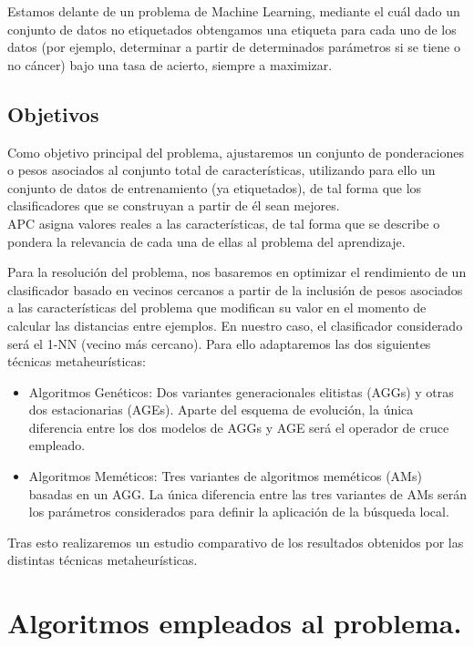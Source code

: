 Estamos delante de un problema de Machine Learning, mediante el cuál dado un conjunto de datos no etiquetados obtengamos una etiqueta para cada uno de los datos (por ejemplo, determinar a partir de determinados parámetros si se tiene o no cáncer) bajo una tasa de acierto, siempre a maximizar.\\ 

\subsection{Objetivos}
Como objetivo principal del problema, ajustaremos un conjunto de ponderaciones o pesos asociados al conjunto total de características, utilizando para ello un conjunto de datos de entrenamiento (ya etiquetados), de tal forma que los clasificadores que se construyan a partir de él sean mejores.\\ 

APC asigna valores reales a las características, de tal forma que se describe o pondera la relevancia de cada una de ellas al problema del aprendizaje.

Para la resolución del problema, nos basaremos en optimizar el rendimiento de un clasificador basado en vecinos cercanos a partir de la inclusión de pesos asociados a las características del problema que modifican su valor en el momento de calcular las distancias entre ejemplos. En nuestro caso, el clasificador considerado será el 1-NN (vecino más cercano). Para ello adaptaremos las dos siguientes técnicas metaheurísticas:

\begin{itemize}
	\item Algoritmos Genéticos: Dos variantes generacionales elitistas (AGGs) y otras dos estacionarias (AGEs). Aparte del esquema de evolución, la única diferencia entre los dos modelos de AGGs y AGE será el operador de cruce empleado.
	
	\item Algoritmos Meméticos: Tres variantes de algoritmos meméticos (AMs) basadas en un AGG. La única diferencia entre las tres variantes de AMs serán los parámetros considerados para definir la aplicación de la búsqueda local.
\end{itemize}


Tras esto realizaremos un estudio comparativo de los resultados obtenidos por las distintas técnicas metaheurísticas.


\section{Algoritmos empleados al problema.}

